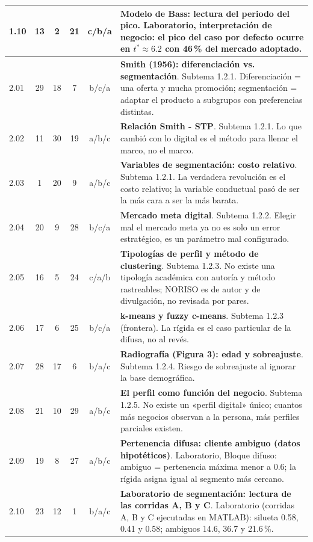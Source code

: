 \documentclass[10pt,letterpaper]{article}
\begin{document}
{\begin{tabularx}{\textwidth}{@{}l c c c c X@{}}
1.10 & 13 & 2 & 21 & c/b/a & \textbf{Modelo de Bass: lectura del periodo del pico}. Laboratorio, interpretación de negocio: el pico del caso por defecto ocurre en $t^\ast\approx6.2$ con 46\,\% del mercado adoptado.\\
\midrule
2.01 & 29 & 18 & 7 & b/c/a & \textbf{Smith (1956): diferenciación vs. segmentación}. Subtema 1.2.1. Diferenciación = una oferta y mucha promoción; segmentación = adaptar el producto a subgrupos con preferencias distintas.\\
2.02 & 11 & 30 & 19 & a/b/c & \textbf{Relación Smith - STP}. Subtema 1.2.1. Lo que cambió con lo digital es el método para llenar el marco, no el marco.\\
2.03 & 1 & 20 & 9 & a/b/c & \textbf{Variables de segmentación: costo relativo}. Subtema 1.2.1. La verdadera revolución es el costo relativo; la variable conductual pasó de ser la más cara a ser la más barata.\\
2.04 & 20 & 9 & 28 & b/c/a & \textbf{Mercado meta digital}. Subtema 1.2.2. Elegir mal el mercado meta ya no es solo un error estratégico, es un parámetro mal configurado.\\
2.05 & 16 & 5 & 24 & c/a/b & \textbf{Tipologías de perfil y método de clustering}. Subtema 1.2.3. No existe una tipología académica con autoría y método rastreables; NORISO es de autor y de divulgación, no revisada por pares.\\
2.06 & 17 & 6 & 25 & b/c/a & \textbf{k-means y fuzzy c-means}. Subtema 1.2.3 (frontera). La rígida es el caso particular de la difusa, no al revés.\\
2.07 & 28 & 17 & 6 & b/a/c & \textbf{Radiografía (Figura 3): edad y sobreajuste}. Subtema 1.2.4. Riesgo de sobreajuste al ignorar la base demográfica.\\
2.08 & 21 & 10 & 29 & a/b/c & \textbf{El perfil como función del negocio}. Subtema 1.2.5. No existe un «perfil digital» único; cuantos más negocios observan a la persona, más perfiles parciales existen.\\
2.09 & 19 & 8 & 27 & a/b/c & \textbf{Pertenencia difusa: cliente ambiguo (datos hipotéticos)}. Laboratorio, Bloque difuso: ambiguo = pertenencia máxima menor a 0.6; la rígida asigna igual al segmento más cercano.\\
2.10 & 23 & 12 & 1 & b/a/c & \textbf{Laboratorio de segmentación: lectura de las corridas A, B y C}. Laboratorio (corridas A, B y C ejecutadas en MATLAB): silueta 0.58, 0.41 y 0.58; ambiguos 14.6, 36.7 y 21.6\,\%.\\
\midrule

\end{tabularx}}
\end{document}
